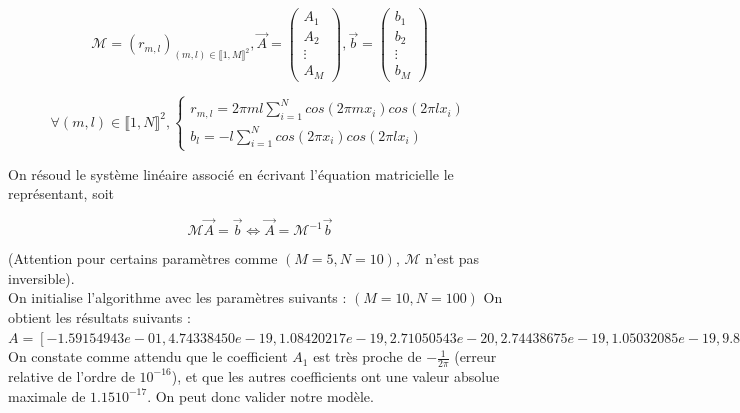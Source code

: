 \documentclass[]{article}
\begin{document}
\begin{equation}
    \mathcal{M} = (r_{m,l})_{(m,l)\in \llbracket 1, M\rrbracket ^2}, 
    \Vec{A} = \begin{pmatrix}
                A_1 \\
                A_2 \\
                \vdots \\
                A_M
              \end{pmatrix}, 
    \Vec{b} = \begin{pmatrix}
                b_1 \\
                b_2 \\
                \vdots \\
                b_M
              \end{pmatrix}
\label{eq:définition notation}
\end{equation}

\begin{equation}
\forall (m,l) \in \llbracket 1, N\rrbracket ^2,
\left\{
    \begin{array}{ll}
        r_{m,l} = 2\pi ml \sum_{i=1}^{N}cos(2\pi mx_i)cos(2\pi lx_i) \\
        b_l = -l\sum_{i=1}^{N}cos(2\pi x_i)cos(2\pi lx_i)
    \end{array}
\right.
\label{eq:définition coefficients}
\end{equation}

On résoud le système linéaire associé en écrivant l'équation matricielle le représentant, soit

\begin{equation}
    \mathcal{M} \Vec{A} = \Vec{b} \Leftrightarrow \Vec{A} = \mathcal{M}^{-1}\Vec{b} 
\label{eq:équation matricielle}
\end{equation}

(Attention pour certains paramètres comme $(M=5, N=10)$, $\mathcal{M}$ n'est pas inversible). \\

On initialise l'algorithme avec les paramètres suivants :
$(M=10, N=100)$
On obtient les résultats suivants : \\
$A = [-1.59154943e-01,  4.74338450e-19,  1.08420217e-19,  2.71050543e-20,
2.74438675e-19,  1.05032085e-19,  9.82558219e-20,  5.92923063e-20,
5.42101086e-20,  5.42101086e-20]$ \\
On constate comme attendu que le coefficient $A_1$ est très proche de $-\frac{1}{2\pi}$ (erreur relative de l'ordre de $10^{-16}$), et que les autres coefficients ont une valeur absolue maximale de $1.15 10^{-17}$.
On peut donc valider notre modèle.
\end{document}
